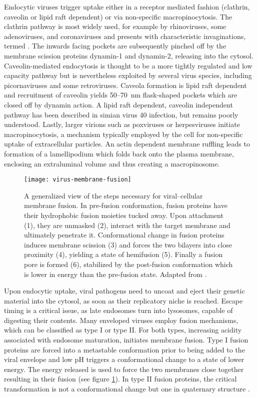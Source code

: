 Endocytic viruses trigger uptake either in a receptor mediated fashion (clathrin, caveolin or lipid raft dependent) or via non-specific macropinocytosis. The clathrin pathway is most widely used, for example by rhinoviruses, some adenoviruses, and coronaviruses and presents with characteristic invaginations, termed . The inwards facing pockets are subsequently pinched off by the membrane scission proteins dynamin-1 and dynamin-2, releasing  into the cytosol. Caveolin-mediated endocytosis is thought to be a more tightly regulated and low capacity pathway but is nevertheless exploited by several virus species, including picornaviruses and some retroviruses. Caveola formation is lipid raft dependent and recruitment of caveolin yields 50--\SI{70}{\nano\meter} flask-shaped pockets which are closed off by dynamin action. A lipid raft dependent, caveolin independent pathway has been described in simian virus 40 infection, but remains poorly understood. Lastly, larger virions such as poxviruses or herpesviruses initiate macropinocytosis, a mechanism typically employed by the cell for non-specific uptake of extracellular particles. An actin dependent membrane ruffling leads to formation of a lamellipodium which folds back onto the plasma membrane, enclosing an extraluminal volume and thus creating a macropinosome.

\begin{figure}
  \centering
  \texttt{[image: virus-membrane-fusion]}
  \caption[A generalized view of the steps necessary for viral--cellular membrane fusion.]{A generalized view of the steps necessary for viral--cellular membrane fusion. In pre-fusion conformation, fusion proteins have their hydrophobic fusion moieties tucked away. Upon attachment (1), they are unmasked (2), interact with the target membrane and ultimately penetrate it. Conformational change in fusion proteins induces membrane scission (3) and forces the two bilayers into close proximity (4), yielding a state of hemifusion (5). Finally a fusion pore is formed (6), stabilized by the post-fusion conformation which is lower in energy than the pre-fusion state. Adapted from \citet{Hulo2011}.}
  \label{fig:virus-membrane-fusion}
\end{figure}

Upon endocytic uptake, viral pathogens need to uncoat and eject their genetic material into the cytosol, as soon as their replicatory niche is reached. Escape timing is a critical issue, as late endosomes turn into lysosomes, capable of digesting their contents. Many enveloped viruses employ fusion mechanisms, which can be classified as type I or type II. For both types, increasing acidity associated with endosome maturation, initiates membrane fusion. Type I fusion proteins are forced into a metastable conformation prior to being added to the viral envelope and low pH triggers a conformational change to a state of lower energy. The energy released is used to force the two membranes close together resulting in their fusion (see figure \ref{fig:virus-membrane-fusion}). In type II fusion proteins, the critical transformation is not a conformational change but one in quaternary structure \citep{Harrison2008}.

